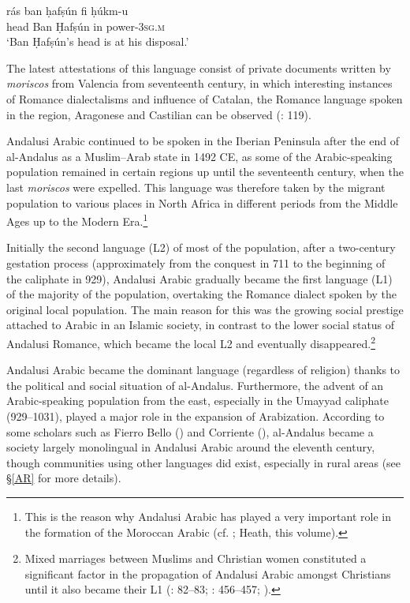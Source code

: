 \documentclass[output=paper,modfonts,nonflat]{langsci/langscibook}
\begin{document}
\ex\label{ex:key:}
\gll rás ban ḥafṣún fi ḥúkm-u \\
head Ban Ḥafṣún in power-\textsc{3sg.m}\\
\glt ‘Ban Ḥafṣún’s head is at his disposal.’
\z
\z

The latest attestations of this language consist of private documents written by \textit{moriscos} from Valencia from seventeenth century, in which interesting instances of Romance dialectalisms and influence of Catalan, the Romance language spoken in the region, Aragonese and Castilian can be observed (\citealt{BarcelóLabarta2009}: 119).

Andalusi Arabic continued to be spoken in the Iberian Peninsula after the end of al-Andalus as a Muslim–Arab state in 1492 CE, as some of the Arabic-speaking population remained in certain regions up until the seventeenth century, when the last \textit{moriscos} were expelled. This language was therefore taken by the migrant population to various places in North Africa in different periods from the Middle Ages up to the Modern Era.\footnote{This is the reason why Andalusi Arabic has played a very important role in the formation of the Moroccan Arabic (cf. \citealt{Vicente2010}; Heath, this volume).} 

Initially the second language (L2) of most of the population, after a two-century gestation process (approximately from the conquest in 711 to the beginning of the caliphate in 929), Andalusi Arabic gradually became the first language (L1) of the majority of the population, overtaking the Romance dialect spoken by the original local population. The main reason for this was the growing social prestige attached to Arabic in an Islamic society, in contrast to the lower social status of Andalusi Romance, which became the local L2 and eventually disappeared.\footnote{Mixed marriages between Muslims and Christian women constituted a significant factor in the propagation of Andalusi Arabic amongst Christians until it also became their L1 (\citealt{Guichard1989}: 82–83; \citeyear{Guichard1995}: 456–457; \citealt{Chalmeta2003}).}  

Andalusi Arabic became the dominant language (regardless of religion) thanks to the political and social situation of al-Andalus. Furthermore, the advent of an Arabic-speaking population from the east, especially in the Umayyad caliphate (929--1031), played a major role in the expansion of Arabization. According to some scholars such as Fierro Bello (\citeyear{FierroBello2001}) and Corriente (\citeyear[104]{Corriente2008}), al-Andalus became a society largely monolingual in Andalusi Arabic around the eleventh century, though communities using other languages did exist, especially in rural areas (see §\ref{AR} for more details). 
\end{document}
